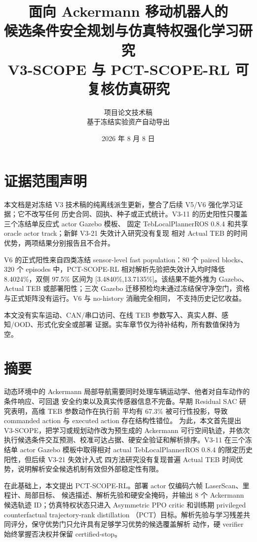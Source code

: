 \documentclass[12pt,a4paper,oneside]{report}
\title{\Huge 面向 Ackermann 移动机器人的\\候选条件安全规划与仿真特权强化学习研究\\[0.8em]\Large V3-SCOPE 与 PCT-SCOPE-RL 可复核仿真研究}
\author{项目论文技术稿\\\small 基于冻结实验资产自动导出}
\date{2026 年 8 月 8 日}
\begin{document}
\maketitle

\chapter*{证据范围声明}
本文档是对冻结 V3 技术稿的纯离线派生更新，整合了后续 V5/V6 强化学习证据；它不改写任何
历史合同、回执、种子或正式统计。V3-11 的历史阳性只覆盖三个冻结单反应式 actor Gazebo 模板、
固定 TebLocalPlannerROS 0.8.4 和共享 oracle actor track；新鲜 V3-21 失效计入研究没有复现
相对 Actual TEB 的时间优势，两项结果分别报告且不合并。

V6 的正式阳性来自四类冻结 sensor-level fast population：80 个 paired blocks、320 个 episodes
中，PCT-SCOPE-RL 相对解析先验把失效计入均时降低 8.4024\%，双侧 97.5\% 区间为
[3.4840\%,13.7135\%]。该结果不能外推为 Gazebo、Actual TEB 或部署阳性；三次 Gazebo
迁移预检均未通过冻结保守净空门，资格与正式矩阵没有运行。V6 与 no-history 消融完全相同，
不支持历史记忆收益。

本文没有实车运动、CAN/串口访问、在线 TEB 参数写入、真实人群、感知/OOD、形式化安全或部署
证据。实车章节仅为待补结构，所有数值保持为空。

\chapter*{摘要}
动态环境中的 Ackermann 局部导航需要同时处理车辆运动学、他者对自车动作的条件响应、可回退
安全约束以及真实传感器信息不完备。早期 Residual SAC 研究表明，高维 TEB 参数动作在执行前
平均有 67.3\% 被可行性投影，导致 commanded action 与 executed action 存在结构性错位。
为此，本文首先提出 V3-SCOPE，把学习或规划动作改为预生成的 Ackermann 可行空间轨迹，并依次
执行候选条件交互预测、校准可达占据、硬安全验证和解析排序。V3-11 在三个冻结单 actor Gazebo
模板中取得相对 actual TebLocalPlannerROS 0.8.4 的限定历史阳性，但后续 V3-21 失效计入式
四方法研究没有复现普遍 Actual TEB 时间优势，说明解析安全候选机制有效但外部稳定性有限。

在此基础上，本文提出 PCT-SCOPE-RL。部署 actor 仅编码六帧 LaserScan、里程计、局部目标、
候选描述、解析先验和硬安全掩码，并输出 8 个 Ackermann 候选轨迹 ID；仿真特权状态只进入
Asymmetric PPO critic 和训练期 privileged counterfactual trajectory-rank distillation
（PCT）目标。解析先验与学习残差共同评分，保守优势门只允许具有足够学习优势的候选覆盖解析
动作，硬 verifier 始终掌握否决权并保留 certified-stop。
\end{document}
